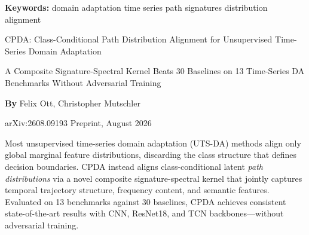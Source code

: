 \documentclass[10pt,twocolumn]{article}
\begin{document}
\setlength{\parindent}{0pt}
\setlength{\parskip}{4pt}

{\small\color{keywordgray}\textbf{Keywords:}
  domain adaptation \textbullet{}
  time series \textbullet{}
  path signatures \textbullet{}
  distribution alignment}\par\vspace{4pt}

{\LARGE\bfseries\raggedright
  CPDA: Class-Conditional Path Distribution
  Alignment for Unsupervised Time-Series
  Domain Adaptation}\par\vspace{4pt}

{\large\itshape\raggedright
  A Composite Signature-Spectral Kernel Beats 30 Baselines
  on 13 Time-Series DA Benchmarks Without Adversarial Training}\par\vspace{6pt}

{\small\textbf{By} Felix Ott, Christopher Mutschler}\par\vspace{2pt}

{\small\color{keywordgray}arXiv:2608.09193 \textbullet{} Preprint, August 2026}
\par\vspace{2pt}\noindent{\color{rulered}\rule{\columnwidth}{0.6pt}}\vspace{6pt}

Most unsupervised time-series domain adaptation (UTS-DA) methods align only global
marginal feature distributions, discarding the class structure that defines decision
boundaries. CPDA instead aligns class-conditional latent \emph{path distributions}
via a novel composite signature-spectral kernel that jointly captures temporal
trajectory structure, frequency content, and semantic features. Evaluated on
13 benchmarks against 30 baselines, CPDA achieves consistent state-of-the-art
results with CNN, ResNet18, and TCN backbones---without adversarial training.
\end{document}
